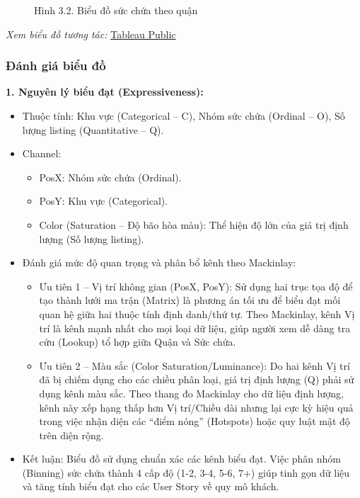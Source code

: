 \begin{figure}[H]
    \centering
    \caption{Hình 3.2. Biểu đồ sức chứa theo quận}
    \label{fig:domain-task3-chart2}
\end{figure}

\noindent\small\textit{Xem biểu đồ tương tác: }\href{https://public.tableau.com/app/profile/duy.le4605/viz/Group10_17788537028430/Task3_2-HeatmapCapacitybyBorough?publish=yes}{Tableau Public}\normalsize

\subsubsection{Đánh giá biểu đồ}

\textbf{1. Nguyên lý biểu đạt (Expressiveness):}

\begin{itemize}
    \item Thuộc tính: Khu vực (Categorical -- C), Nhóm sức chứa (Ordinal -- O), Số lượng listing (Quantitative -- Q).
    \item Channel:
    \begin{itemize}
        \item PosX: Nhóm sức chứa (Ordinal).
        \item PosY: Khu vực (Categorical).
        \item Color (Saturation -- Độ bão hòa màu): Thể hiện độ lớn của giá trị định lượng (Số lượng listing).
    \end{itemize}
    \item Đánh giá mức độ quan trọng và phân bổ kênh theo Mackinlay:
    \begin{itemize}
        \item Ưu tiên 1 -- Vị trí không gian (PosX, PosY): Sử dụng hai trục tọa độ để tạo thành lưới ma trận (Matrix) là phương án tối ưu để biểu đạt mối quan hệ giữa hai thuộc tính định danh/thứ tự. Theo Mackinlay, kênh Vị trí là kênh mạnh nhất cho mọi loại dữ liệu, giúp người xem dễ dàng tra cứu (Lookup) tổ hợp giữa Quận và Sức chứa.
        \item Ưu tiên 2 -- Màu sắc (Color Saturation/Luminance): Do hai kênh Vị trí đã bị chiếm dụng cho các chiều phân loại, giá trị định lượng (Q) phải sử dụng kênh màu sắc. Theo thang đo Mackinlay cho dữ liệu định lượng, kênh này xếp hạng thấp hơn Vị trí/Chiều dài nhưng lại cực kỳ hiệu quả trong việc nhận diện các ``điểm nóng'' (Hotspots) hoặc quy luật mật độ trên diện rộng.
    \end{itemize}
    \item Kết luận: Biểu đồ sử dụng chuẩn xác các kênh biểu đạt. Việc phân nhóm (Binning) sức chứa thành 4 cấp độ (1-2, 3-4, 5-6, 7+) giúp tinh gọn dữ liệu và tăng tính biểu đạt cho các User Story về quy mô khách.
\end{itemize}

